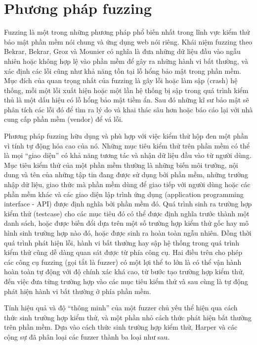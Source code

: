\section{Phương pháp fuzzing}
Fuzzing \parencite{klees2018evaluating} là một trong những phương pháp phổ biến nhất trong lĩnh vực kiểm thử bảo mật phần mềm nói chung và ứng dụng web nói riêng. Khái niệm fuzzing theo Bekrar, Bekrar, Groz và Mounier \parencite{vimpari2015evaluation} có nghĩa là đưa những dữ liệu đầu vào ngẫu nhiên hoặc không hợp lệ vào phần mềm để gây ra những hành vi bất thường, và xác định các lỗi cũng như khả năng tồn tại lỗ hổng bảo mật trong phần mềm. Mục đích của quan trọng nhất của fuzzing là gây lỗi hoặc làm sập (crash) hệ thống, mỗi một lỗi xuất hiện hoặc một lần hệ thống bị sập trong quá trình kiểm thủ là một dấu hiệu có lỗ hổng bảo mật tiềm ẩn. Sau đó những kĩ sư bảo mật sẽ phân tích các lỗi đó để tìm ra lý do và khai thác sâu hơn hoặc báo cáo lại với nhà cung cấp phần mềm (vendor) để vá lỗi.\par
Phương pháp fuzzing hữu dụng và phù hợp với việc kiểm thử hộp đen một phần vì tính tự động hóa cao của nó. Những mục tiêu kiểm thử trên phần mềm có thể là mọi ``giao diện'' có khả năng tương tác và nhận dữ liệu đầu vào từ người dùng. Mục tiêu kiểm thử của một phần mềm thường là những biến môi trường, nội dung và tên của những tập tin đang được sử dụng bởi phần mềm, những trường nhập dữ liệu, giao thức mà phần mềm dùng để giao tiếp với người dùng hoặc các phần mềm khác và các giao diện lập trình ứng dụng (application programming interface - API) được định nghĩa bởi phần mềm đó. Quá trình sinh ra trường hợp kiểm thử (testcase) cho các mục tiêu đó có thể được định nghĩa trước thành một danh sách, hoặc được biến đổi dựa trên một số trường hợp kiểm thử gốc hay mô hình sinh trường hợp nào đó, hoặc được sinh ra hoàn toàn ngẫu nhiên. Đồng thời quá trình phát hiện lỗi, hành vi bất thường hay sập hệ thống trong quá trình kiểm thử cũng dễ dàng quan sát được từ phía công cụ. Hai điều trên cho phép các công cụ fuzzing (gọi tắt là fuzzer) có một lợi thể to lớn là có thể vận hành hoàn toàn tự động với độ chính xác khá cao, từ bước tạo trường hợp kiểm thử, đến việc đưa từng trường hợp vào các mục tiêu kiểm thử và sau cùng là tự động phát hiện hành vi bất thường ở phía phần mềm.\par
Tính hiệu quả và độ ``thông minh'' của một fuzzer chủ yếu thể hiện qua cách thức sinh trường hợp kiểm thử, và một phần nhỏ cách thức phát hiện bất thường trên phần mềm. Dựa vào cách thức sinh trường hợp kiểm thử, Harper và các cộng sự \parencite{harper2011gray} đã phân loại các fuzzer thành ba loại như sau.
